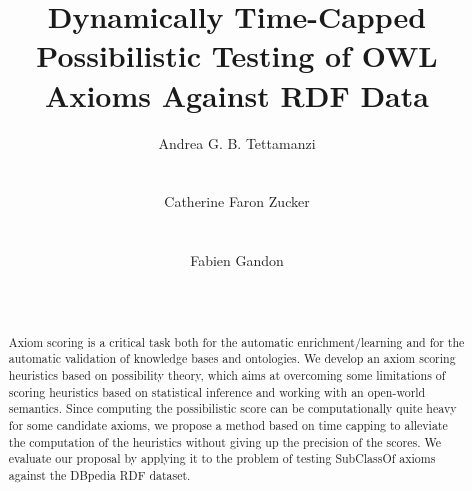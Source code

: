 \documentclass{sig-alternate}
\begin{document}
%

\title{Dynamically Time-Capped Possibilistic Testing of OWL Axioms Against RDF Data}


\author{
%
%
\alignauthor
Andrea G. B. Tettamanzi\\
  \\
  \\
\alignauthor
Catherine Faron Zucker\\
  \\
  \\
\alignauthor
Fabien Gandon\\
  \\
  \\
}

\maketitle

\begin{abstract}
Axiom scoring is a critical task both for the automatic enrichment/learning
and for the automatic validation of knowledge bases and ontologies.
We develop an axiom scoring heuristics based on possibility theory,
which aims at overcoming some limitations of scoring heuristics based on statistical inference
and working with an open-world semantics.
Since computing the possibilistic score can be computationally quite heavy
for some candidate axioms, we propose a method based on time capping
to alleviate the computation of the heuristics without giving up the precision of the scores.
We evaluate our proposal by applying it to the problem of testing \textsf{SubClassOf}
axioms against the DBpedia RDF dataset.
\end{abstract}
\end{document}
